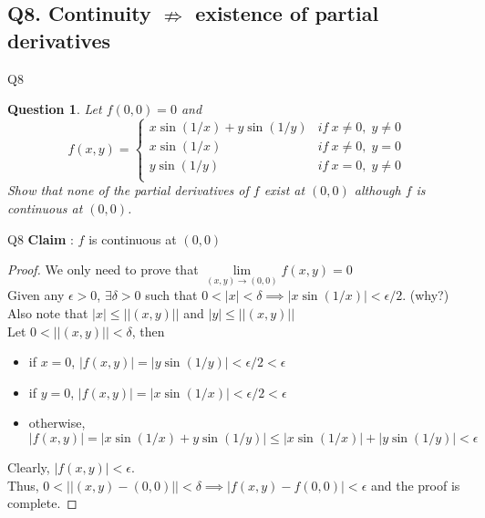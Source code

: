 \documentclass[handout,aspectratio=169]{beamer}
\newtheorem{qsn}{Question}
\newcommand{\norm}[1]{|#1|}
\newcommand{\normtwo}[1]{||#1||}
\begin{document}
\subsection{Q8. Continuity $\nRightarrow$ existence of partial derivatives}
\begin{frame}{Q8}
    \begin{qsn}
        Let $f(0,0) = 0$ and 
        \begin{equation*}
            f(x,y) = 
            \begin{cases}
                    x\sin(1/x) + y\sin(1/y) & if~x\neq 0,\; y \ne 0\\
                    x \sin(1/x) & if~x\neq 0,\; y = 0\\
                    y \sin(1/y) & if~x= 0,\; y \neq 0\\
            \end{cases}
        \end{equation*}
        Show that none of the partial derivatives of $f$ exist at $(0, 0)$ although $f$ is continuous at $(0, 0)$.
    \end{qsn}
\end{frame}
\begin{frame}{Q8}
    \textbf{Claim} : $f$ is continuous at $(0,0)$\\
    \pause
    \begin{proof}
    We only need to prove that $\lim\limits_{(x,y) \to (0,0)} f(x,y) = 0$\\
    \pause
    Given any $\epsilon > 0$, $\exists\delta > 0$ such that $0<|x|<\delta\implies |x\sin(1/x)| < \epsilon/2$. (why?)\\
    \pause
    Also note that $\norm{x}\leq\normtwo{(x,y)}$ and $\norm{y}\leq \normtwo{(x,y)}$\\
    \pause
    Let $0<\normtwo{(x,y)}<\delta$, then
    \begin{itemize}
        \item if $x=0$, $\norm{f(x,y)} = \norm{y\sin(1/y)}<\epsilon/2<\epsilon$
        \item if $y=0$, $\norm{f(x,y)} = \norm{x\sin(1/x)}<\epsilon/2<\epsilon$
        \item otherwise, $\norm{f(x,y)} = \norm{x\sin(1/x)+y\sin(1/y)} \leq \norm{x\sin(1/x)}+\norm{y\sin(1/y)} <\epsilon$
    \end{itemize}
    \pause
     Clearly, $\norm{f(x,y)} < \epsilon$.\\
    \pause
    Thus, $0<\normtwo{(x,y)-(0,0)}<\delta \implies \norm{f(x,y)-f(0,0)}<\epsilon$ and the proof is complete.
    \end{proof}
\end{frame}
\end{document}

